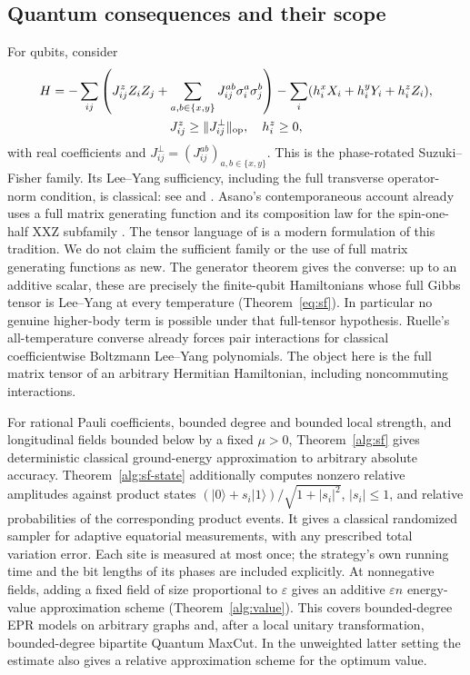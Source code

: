 \documentclass[reqno]{amsart}
\theoremstyle{definition}
\theoremstyle{remark}
\begin{document}
\subsection{Quantum consequences and their scope}

For qubits, consider
\begin{equation}\label{intro:sf}
 \begin{gathered}
 H=-\sum_{ij}
 \left(J^z_{ij}Z_iZ_j+
       \sum_{a,b\in\{x,y\}}J^{ab}_{ij}\sigma_i^a\sigma_j^b\right)
   -\sum_i(h_i^xX_i+h_i^yY_i+h_i^zZ_i),
 \\
 J^z_{ij}\geq\|J^\perp_{ij}\|_{\rm op},\quad h_i^z\geq0 ,
 \end{gathered}
\end{equation}
with real coefficients and
$J^\perp_{ij}=(J^{ab}_{ij})_{a,b\in\{x,y\}}$.
This is the phase-rotated Suzuki--Fisher family.
Its Lee--Yang sufficiency, including the full transverse operator-norm
condition, is classical: see \cite[equation~(2.47)]{SuzukiFisher71}
and \cite[Theorem~2]{Dunlop79}. Asano's contemporaneous account already
uses a full matrix generating function and its composition law for the
spin-one-half XXZ subfamily \cite[equation~(1.15), Theorem~1]{AsanoJapanese70}.
The tensor language of \cite{WBG26} is a modern formulation of this
tradition. We do not claim the sufficient family or the use of full
matrix generating functions as new.
The generator theorem gives the converse: up to an additive
scalar, these are precisely the finite-qubit Hamiltonians whose
full Gibbs tensor is Lee--Yang at every temperature
(Theorem~\ref{eq:sf}). In particular no genuine higher-body term is
possible under that full-tensor hypothesis. Ruelle's all-temperature converse
\cite[Theorem 9]{Ruelle10} already forces pair interactions for classical
coefficientwise Boltzmann Lee--Yang polynomials. The object here is the
full matrix tensor of an arbitrary Hermitian Hamiltonian, including
noncommuting interactions.

For rational Pauli coefficients, bounded degree and bounded local
strength, and longitudinal fields bounded below by a fixed $\mu>0$,
Theorem~\ref{alg:sf} gives deterministic classical ground-energy
approximation to arbitrary absolute accuracy.
Theorem~\ref{alg:sf-state} additionally computes nonzero relative
amplitudes against product states
$(|0\rangle+s_i|1\rangle)/\sqrt{1+|s_i|^2}$, $|s_i|\le1$,
and relative probabilities of the corresponding product events.
It gives a classical randomized sampler for adaptive equatorial
measurements, with any prescribed total variation error. Each site
is measured at most once; the strategy's own running time and
the bit lengths of its phases are included explicitly.
At nonnegative fields, adding a fixed field of size proportional
to $\varepsilon$ gives an additive $\varepsilon n$ energy-value
approximation scheme (Theorem~\ref{alg:value}).
This covers bounded-degree EPR models on arbitrary graphs and,
after a local unitary transformation, bounded-degree bipartite
Quantum MaxCut. In the unweighted latter setting the estimate
also gives a relative approximation scheme for the optimum value.
\end{document}
